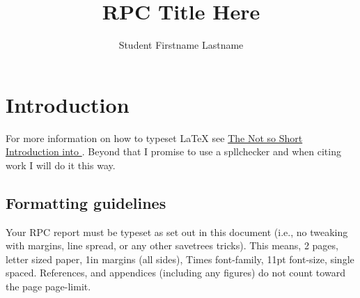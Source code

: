 \documentclass[letterpaper,11pt]{article}
\title{RPC Title Here}
\author{Student Firstname Lastname}
\date{}
\begin{document}
\maketitle

\section{Introduction}

For more information on how to typeset \LaTeX{} see 
\href{http://mirrors.ctan.org/info/lshort/english/lshort.pdf}
{The Not so Short Introduction into \LaTeXe}.
Beyond that I promise to use a spllchecker and when citing work I will do it this way\cite{cao15:edgeminer}.

\subsection{Formatting guidelines}
Your RPC report must be typeset as set out in this document (i.e., no tweaking
with margins, line spread, or any other savetrees tricks). This
means, 2 pages, letter sized paper, 1in margins (all sides), Times font-family, 11pt
font-size, single spaced. References, and appendices (including any figures) do
not count toward the page page-limit.



\end{document}
